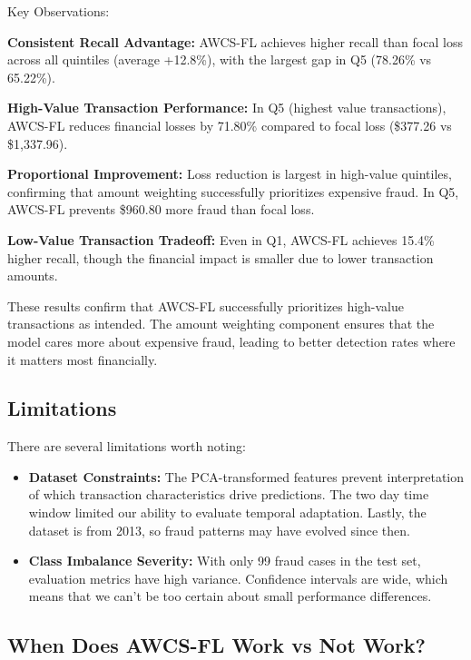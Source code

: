 \documentclass[10pt,twocolumn,letterpaper]{article}
\begin{document}
Key Observations:

\textbf{Consistent Recall Advantage:} AWCS-FL achieves higher recall than focal loss across all quintiles (average +12.8\%), with the largest gap in Q5 (78.26\% vs 65.22\%).

\textbf{High-Value Transaction Performance:} In Q5 (highest value transactions), AWCS-FL reduces financial losses by 71.80\% compared to focal loss (\$377.26 vs \$1,337.96).

\textbf{Proportional Improvement:} Loss reduction is largest in high-value quintiles, confirming that amount weighting successfully prioritizes expensive fraud. In Q5, AWCS-FL prevents \$960.80 more fraud than focal loss.

\textbf{Low-Value Transaction Tradeoff:} Even in Q1, AWCS-FL achieves 15.4\% higher recall, though the financial impact is smaller due to lower transaction amounts.

These results confirm that AWCS-FL successfully prioritizes high-value transactions as intended. The amount weighting component ensures that the model cares more about expensive fraud, leading to better detection rates where it matters most financially.

\subsection{Limitations}

There are several limitations worth noting:

\begin{itemize}
  \item \textbf{Dataset Constraints:} The PCA-transformed features prevent interpretation of which transaction characteristics drive predictions. The two day time window limited our ability to evaluate temporal adaptation. Lastly, the dataset is from 2013, so fraud patterns may have evolved since then.
  
  \item \textbf{Class Imbalance Severity:} With only 99 fraud cases in the test set, evaluation metrics have high variance. Confidence intervals are wide, which means that we can't be too certain about small performance differences.
\end{itemize}

\subsection{When Does AWCS-FL Work vs Not Work?}
\end{document}
